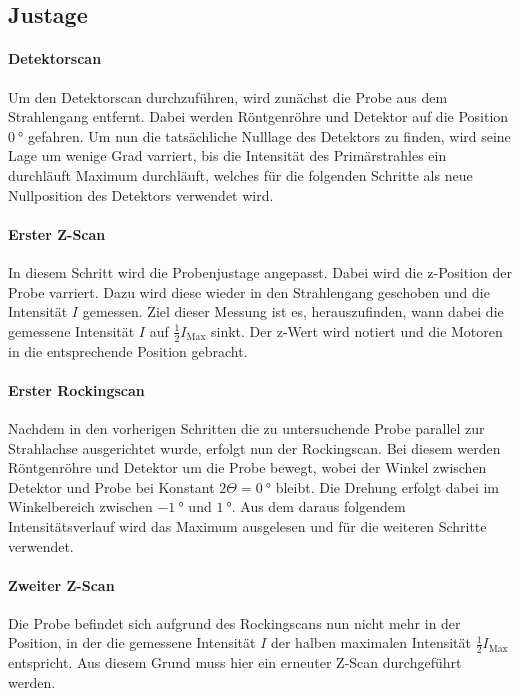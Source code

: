 \subsection{Justage}
\paragraph{Detektorscan}
Um den Detektorscan durchzuführen, wird zunächst die Probe aus dem Strahlengang entfernt. 
Dabei werden Röntgenröhre und Detektor auf die Position $\SI{0}{\degree}$ gefahren. Um nun die tatsächliche Nulllage des Detektors zu finden, wird seine Lage um wenige Grad varriert, bis die Intensität des Primärstrahles ein durchläuft Maximum durchläuft, welches für die folgenden Schritte als neue Nullposition des Detektors verwendet wird. 

\paragraph{Erster Z-Scan}
In diesem Schritt wird die Probenjustage angepasst. Dabei wird die z-Position der Probe varriert. Dazu wird diese wieder in den Strahlengang geschoben und die Intensität $I$ gemessen. Ziel dieser Messung ist es, herauszufinden, wann dabei die gemessene Intensität $I$ auf $\frac{1}{2} I_\text{Max} $ sinkt. Der z-Wert wird notiert und die Motoren in die entsprechende Position gebracht. 

\paragraph{Erster Rockingscan}
Nachdem in den vorherigen Schritten die zu untersuchende Probe parallel zur Strahlachse ausgerichtet wurde, erfolgt nun der Rockingscan. Bei diesem werden Röntgenröhre und Detektor um die Probe bewegt, wobei der Winkel zwischen Detektor und Probe bei Konstant $2\Theta = \SI{0}{\degree}$ bleibt. Die Drehung erfolgt dabei im Winkelbereich zwischen $\SI{-1}{\degree}$ und $\SI{1}{\degree}$. Aus dem daraus folgendem Intensitätsverlauf wird das Maximum ausgelesen und für die weiteren Schritte verwendet. 

\paragraph{Zweiter Z-Scan}
Die Probe befindet sich aufgrund des Rockingscans nun nicht mehr in der Position, in der die gemessene Intensität $I$ der halben maximalen Intensität $\frac{1}{2} I_\text{Max} $ entspricht. Aus diesem Grund muss hier ein erneuter Z-Scan durchgeführt werden. 



